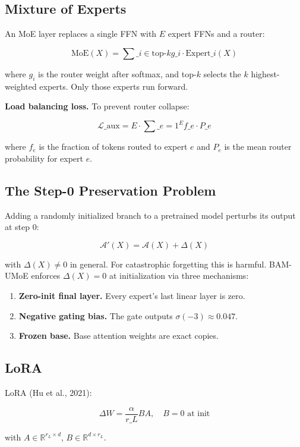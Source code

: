 \subsection{Mixture of Experts}

An MoE layer replaces a single FFN with $E$ expert FFNs and a router:

\[
\text{MoE}(X) = \sum\_{i \in \text{top-}k} g\_i \cdot \text{Expert}\_i(X)
\]

where $g_i$ is the router weight after softmax, and top-$k$ selects the 
$k$ highest-weighted experts. Only those experts run forward.

\textbf{Load balancing loss.} To prevent router collapse:

\[
\mathcal{L}\_\text{aux} = E \cdot \sum\_{e=1}^{E} f\_e \cdot P\_e
\]

where $f_e$ is the fraction of tokens routed to expert $e$ and $P_e$ is the 
mean router probability for expert $e$.

\subsection{The Step-0 Preservation Problem}

Adding a randomly initialized branch to a pretrained model perturbs its 
output at step 0:

\[
\mathcal{A}'(X) = \mathcal{A}(X) + \Delta(X)
\]

with $\Delta(X) \neq 0$ in general. For catastrophic forgetting this is 
harmful. BAM-UMoE enforces $\Delta(X) = 0$ at initialization via three 
mechanisms:

\begin{enumerate}
\item \textbf{Zero-init final layer.} Every expert's last linear layer is zero.
\item \textbf{Negative gating bias.} The gate outputs $\sigma(-3) \approx 0.047$.
\item \textbf{Frozen base.} Base attention weights are exact copies.

\end{enumerate}
\subsection{LoRA}

LoRA (Hu et al., 2021):

\[
\Delta W = \frac{\alpha}{r\_L} B A, \quad B = 0 \text{ at init}
\]

with $A \in \mathbb{R}^{r_L \times d}$, $B \in \mathbb{R}^{d \times r_L}$.

